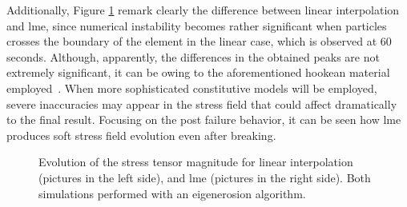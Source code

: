 \documentclass[preprint,12pt,a4paper]{elsarticle}
\begin{document}
Additionally, Figure \ref{fig:Stress-cracked-panel-mode-I}
remark clearly the difference between linear interpolation and
\acrshort{lme}, since numerical instability becomes rather significant
when particles crosses the boundary of the element in the linear
case, which is observed at 60 seconds. Although, apparently, the
differences in the obtained peaks are not extremely significant, it
can be owing to the aforementioned hookean material
employed~\cite{Zhang_EE_2020}. When more sophisticated constitutive
models will be employed, severe inaccuracies may appear in the
stress field that could affect dramatically to the final 
result. Focusing on the post failure behavior, it can be seen how
\acrshort{lme} produces soft stress field evolution even after
breaking. 
\begin{figure}
\centering
{}
\caption{Evolution of the stress tensor magnitude for linear
  interpolation (pictures in the left side), and \acrshort{lme}
  (pictures in the right side). Both simulations performed with an
  eigenerosion algorithm.}
\label{fig:Stress-cracked-panel-mode-I}
\end{figure}
\end{document}
